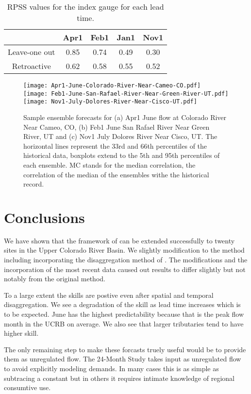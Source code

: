 \documentclass[11pt]{article}
\begin{document}
\begin{table}[ht]
\centering
\caption{RPSS values for the index gauge for each lead time.}\label{tab:indexskill}
\begin{tabular}{ccccc} 
\toprule
& Apr1 & Feb1 & Jan1 & Nov1 \\
\midrule
Leave-one out & 0.85 & 0.74 & 0.49 & 0.30 \\
Retroactive   & 0.62 & 0.58 & 0.55 & 0.52\\
\bottomrule
\end{tabular}
\end{table}



\begin{figure}[htbp] %
   \centering
   \texttt{[image: Apr1-June-Colorado-River-Near-Cameo-CO.pdf]}\\
   \texttt{[image: Feb1-June-San-Rafael-River-Near-Green-River-UT.pdf]}\\
   \texttt{[image: Nov1-July-Dolores-River-Near-Cisco-UT.pdf]}
   \caption{Sample ensemble forecasts for (a) Apr1 June flow at Colorado River Near Cameo, CO, (b) Feb1 June San Rafael River Near Green River, UT and (c) Nov1 July Dolores River Near Cisco, UT. The horizontal lines represent the 33rd and 66th percentiles of the historical data, boxplots extend to the 5th and 95th percentiles of each ensemble. MC stands for the median correlation, the correlation of the median of the ensembles withe the historical record.}
   \label{fig:box}
\end{figure}

%

\section{Conclusions}

We have shown that the framework of \cite{Bracken:2010p2682} can be extended successfully to twenty sites in the Upper Colorado River Basin.  We slightly modification to the method including incorporating the disaggregation method of \cite{Nowak:2010p2738}.  The modifications and the incorporation of the most recent data caused out results to differ slightly but not notably from the original method. 

To a large extent the skills are postive even after spatial and temporal disaggregation. We see a degradation of the skill as lead time increases which is to be expected. June has the highest predictability because that is the peak flow month in the UCRB on average. We also see that larger tributaries tend to have higher skill. 

The only remaining step to make these forcasts truely useful would be to provide them as unregulated flow. The 24-Month Study takes input as unregulated flow to avoid explicitly modeling demands. In many cases this is as simple as subtracing a constant but in others it requires intimate knowledge of regional consumtive use. 

\clearpage

\end{document}

